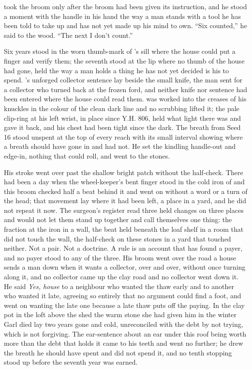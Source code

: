 \scenebreak

 took the broom only after the broom had been given its instruction, and he stood a moment with the handle in his hand the way a man stands with a tool he has been told to take up and has not yet made up his mind to own. “Six counted,” he said to the wood. “The next I don't count.”

Six years stood in the worn thumb-mark of 's sill where the house could put a finger and verify them; the seventh stood at the lip where no thumb of the house had gone, held the way a man holds a thing he has not yet decided is his to spend. 's unforged collector sentence lay beside the small knife, the man sent for a collector who turned back at the frozen ford, and neither knife nor sentence had been entered where the house could read them.  was worked into the creases of his knuckles in the colour of the clean dark line and no scrubbing lifted it; the pale clip-ring at his left wrist, in place since Y.H. 806, held what light there was and gave it back, and his chest had been tight since the dark. The breath from Seed 16 stood unspent at the top of every reach with its small interval showing where a breath should have gone in and had not. He set the kindling handle-out and edge-in, nothing that could roll, and went to the stones.

His stroke went over  past the shallow bright patch without the half-check. There had been a day when the wheel-keeper's bent finger stood in the cold iron of  and this broom checked half a beat behind it and went on without a word or a turn of the head; that movement lay where it had been left, a place in a yard, and he did not repeat it now. The surgeon's register read three held changes on three places and would not let them stand up together and call themselves one thing: the fraction at the iron in a wall, the beat held beneath the loaf shelf in a room that did not touch the wall, the half-check on these stones in a yard that touched neither. Not a pair. Not a doctrine. A rule is an account that has found a payer, and no payer stood to any of the three. His broom went over the road a house sends a man down when it wants a collector, over and over, without once turning along it, and no collector came up the clay road and no collector went down it. He said \emph{Yes, house} to a neighbour who wanted the thaw early and to another who wanted it late, agreeing so entirely that no argument could find a foot, and went on wanting the late one because a late thaw puts off the paying. In the clay pot in the loft above the shed the warm stone she had given him in the winter Garl died lay two years gone and cold, unreconciled with the debt by not trying, which is not forgiving. The ear-sentence about an ear under this roof being worth more than the debt that holds it came to his teeth and went no further; he drew the breath he should have spent and did not spend it, and no tenth stopping stood up before the seventh year was earned.


